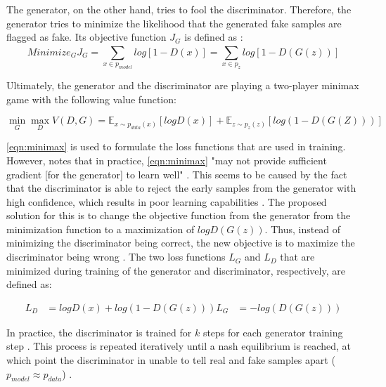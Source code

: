 The generator, on the other hand, tries to fool the discriminator.
Therefore, the generator tries to minimize the likelihood that the generated fake samples are flagged as fake.
Its objective function $J_G$ is defined as \cite{aggarwal2018NeuralNetworksDeep}:
\begin{equation}
    \label{eqn:generator}
    Minimize_GJ_G= \sum_{x\in p_{model}}^{} log [1-D(x)] = \sum_{x\in p_z}^{} log [1-D(G(z))]
\end{equation}

Ultimately, the generator and the discriminator are playing a two-player minimax game with the following value function:

\begin{equation}
    \label{eqn:minimax}
    \min_G\max_DV(D,G)=\mathbb{E}_{x\sim p_{data}(x)} [log D(x)] + \mathbb{E}_{z\sim p_z(z)}[log( 1-D(G(Z)))]
\end{equation}

\autoref{eqn:minimax} is used to formulate the loss functions that are used in training.
However, \cite{NIPS2014_5ca3e9b1} notes that in practice, \autoref{eqn:minimax} "may not provide sufficient gradient [for the generator] to learn well" \cite[p. 3]{NIPS2014_5ca3e9b1}.
This seems to be caused by the fact that the discriminator is able to reject the early samples from the generator with high confidence, which results in poor learning capabilities \cite{NIPS2014_5ca3e9b1}.
The proposed solution for this is to change the objective function from the generator from the minimization function  to a maximization of $logD(G(z))$.
Thus, instead of minimizing the discriminator being correct, the new objective is to maximize the discriminator being wrong \cite{NIPS2014_5ca3e9b1}. 
The two loss functions $L_G$ and $L_D$ that are minimized during training of the generator and discriminator, respectively, are defined as:

\begin{equation}
  \begin{align}
  \label{eqn:gan-loss}
  L_D&=logD(x)+log(1-D(G(z)))
  L_G&=-log(D(G(z)))
\end{align}
\end{equation}


In practice, the discriminator is trained for $k$ steps for each generator training step \cite{aggarwal2018NeuralNetworksDeep}.
This process is repeated iteratively until a nash equilibrium is reached, at which point the discriminator in unable to tell real and fake samples apart ($p_{model}\approx p_{data}$) \cite{NIPS2014_5ca3e9b1, aggarwal2018NeuralNetworksDeep}.

